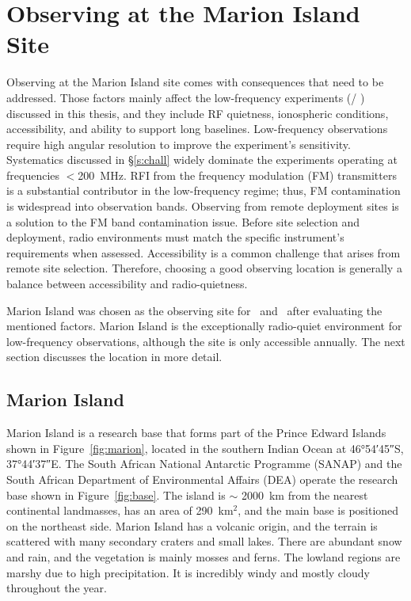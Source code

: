\chapter{Observing at the Marion Island Site}

Observing at the Marion Island site comes with consequences that need to be addressed. Those factors mainly affect the low-frequency experiments (\prizm / \albatros) discussed in this thesis, and they include RF quietness, ionospheric conditions, accessibility, and ability to support long baselines. Low-frequency observations require high angular resolution to improve the experiment's sensitivity. Systematics discussed in \S\ref{s:chall} widely dominate the experiments operating at frequencies $<$\SI{200}{MHz}. RFI from the frequency modulation (FM) transmitters is a substantial contributor in the low-frequency regime; thus, FM contamination is widespread into observation bands. Observing from remote deployment sites is a solution to the FM band contamination issue. Before site selection and deployment, radio environments must match the specific instrument's requirements when assessed. Accessibility is a common challenge that arises from remote site selection. Therefore, choosing a good observing location is generally a balance between	accessibility and radio-quietness. 

Marion Island was chosen as the observing site for \prizm\ and \albatros\ after evaluating the mentioned factors. Marion Island is the exceptionally radio-quiet environment for low-frequency observations, although the site is only accessible annually. The next section discusses the location in more detail.

\section{Marion Island}

Marion Island is a research base that forms part of the Prince Edward Islands shown in Figure~\ref{fig:marion}, located in the southern Indian Ocean at \ang{46;54;45}S, \ang{37;44;37}E. The South African National Antarctic Programme (SANAP) and the South African Department of Environmental Affairs (DEA) operate the research base shown in Figure~\ref{fig:base}. The island is $\sim$ \SI{2000}{\kilo\metre} from the nearest continental landmasses, has an area of 290~km$^2$, and the main base is positioned on the northeast side. Marion Island has a volcanic origin, and the terrain is scattered with many secondary craters and small lakes. There are abundant snow and rain, and the vegetation is mainly mosses and ferns. The lowland regions are marshy due to high precipitation. It is incredibly windy and mostly cloudy throughout the year.

